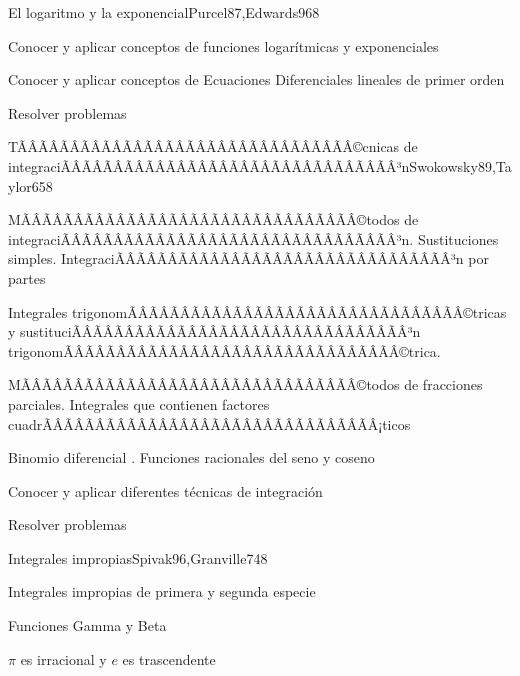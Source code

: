\begin{sumilla}
\begin{unit}{El logaritmo y la exponencial}{Purcel87,Edwards96}{8}
\begin{objetivos}
	\item Conocer y aplicar conceptos de funciones logar\'itmicas y exponenciales
	\item Conocer y aplicar conceptos de Ecuaciones Diferenciales lineales de primer orden
	\item Resolver problemas
\end{objetivos}
\end{unit}

\begin{unit}{TÃÂÃÂÃÂÃÂÃÂÃÂÃÂÃÂÃÂÃÂÃÂÃÂÃÂÃÂÃÂÃÂ©cnicas de integraciÃÂÃÂÃÂÃÂÃÂÃÂÃÂÃÂÃÂÃÂÃÂÃÂÃÂÃÂÃÂÃÂ³n}{Swokowsky89,Taylor65}{8}
\begin{topicos}
	\item MÃÂÃÂÃÂÃÂÃÂÃÂÃÂÃÂÃÂÃÂÃÂÃÂÃÂÃÂÃÂÃÂ©todos de integraciÃÂÃÂÃÂÃÂÃÂÃÂÃÂÃÂÃÂÃÂÃÂÃÂÃÂÃÂÃÂÃÂ³n. Sustituciones simples. IntegraciÃÂÃÂÃÂÃÂÃÂÃÂÃÂÃÂÃÂÃÂÃÂÃÂÃÂÃÂÃÂÃÂ³n por partes
	\item Integrales trigonomÃÂÃÂÃÂÃÂÃÂÃÂÃÂÃÂÃÂÃÂÃÂÃÂÃÂÃÂÃÂÃÂ©tricas y sustituciÃÂÃÂÃÂÃÂÃÂÃÂÃÂÃÂÃÂÃÂÃÂÃÂÃÂÃÂÃÂÃÂ³n trigonomÃÂÃÂÃÂÃÂÃÂÃÂÃÂÃÂÃÂÃÂÃÂÃÂÃÂÃÂÃÂÃÂ©trica.
	\item MÃÂÃÂÃÂÃÂÃÂÃÂÃÂÃÂÃÂÃÂÃÂÃÂÃÂÃÂÃÂÃÂ©todos de fracciones parciales. Integrales que contienen factores  cuadrÃÂÃÂÃÂÃÂÃÂÃÂÃÂÃÂÃÂÃÂÃÂÃÂÃÂÃÂÃÂÃÂ¡ticos
	\item Binomio diferencial . Funciones racionales del seno y coseno
\end{topicos}

\begin{objetivos}
	\item Conocer y aplicar diferentes t\'ecnicas de integraci\'on
	\item Resolver problemas
\end{objetivos}
\end{unit}

\begin{unit}{Integrales impropias}{Spivak96,Granville74}{8}
\begin{topicos}
	\item Integrales impropias de primera y segunda especie
	\item Funciones Gamma y Beta
	\item $\pi$ es irracional y $e$ es trascendente
\end{topicos}


\end{unit}
\end{sumilla}
